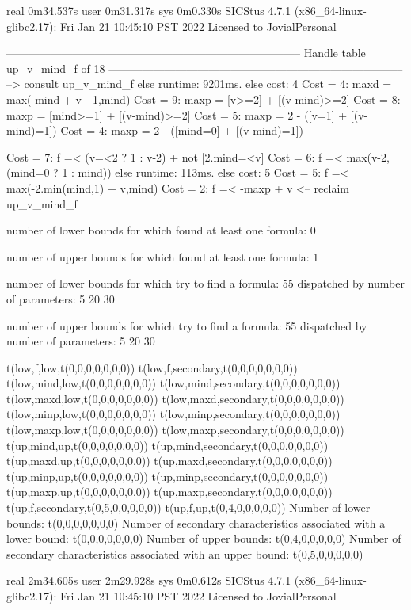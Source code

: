 real	0m34.537s
user	0m31.317s
sys	0m0.330s
SICStus 4.7.1 (x86_64-linux-glibc2.17): Fri Jan 21 10:45:10 PST 2022
Licensed to JovialPersonal


--------------------------------------------------------------------------------
Handle table up_v_mind_f of 18
--------------------------------------------------------------------------------
--> consult up_v_mind_f
else runtime: 9201ms. else cost: 4
Cost =  4:  maxd = max(-mind + v - 1,mind) %
Cost =  9:  maxp = [v>=2] + [(v-mind)>=2]
Cost =  8:  maxp = [mind>=1] + [(v-mind)>=2]
Cost =  5:  maxp = 2 - ([v=1] + [(v-mind)=1])
Cost =  4:  maxp = 2 - ([mind=0] + [(v-mind)=1])
----------

Cost =  7:  f =< (v=<2 ? 1 : v-2) + not [2.mind=<v] %
Cost =  6:  f =< max(v-2, (mind=0 ? 1 : mind)) %
else runtime: 113ms. else cost: 5
Cost =  5:  f =< max(-2.min(mind,1) + v,mind)
Cost =  2:  f =< -maxp + v
<-- reclaim up_v_mind_f

number of lower bounds for which found at least one formula: 0

number of upper bounds for which found at least one formula: 1

number of lower bounds for which try to find a formula: 55
dispatched by number of parameters: 5  20  30

number of upper bounds for which try to find a formula: 55
dispatched by number of parameters: 5  20  30

t(low,f,low,t(0,0,0,0,0,0,0))
t(low,f,secondary,t(0,0,0,0,0,0,0))
t(low,mind,low,t(0,0,0,0,0,0,0))
t(low,mind,secondary,t(0,0,0,0,0,0,0))
t(low,maxd,low,t(0,0,0,0,0,0,0))
t(low,maxd,secondary,t(0,0,0,0,0,0,0))
t(low,minp,low,t(0,0,0,0,0,0,0))
t(low,minp,secondary,t(0,0,0,0,0,0,0))
t(low,maxp,low,t(0,0,0,0,0,0,0))
t(low,maxp,secondary,t(0,0,0,0,0,0,0))
t(up,mind,up,t(0,0,0,0,0,0,0))
t(up,mind,secondary,t(0,0,0,0,0,0,0))
t(up,maxd,up,t(0,0,0,0,0,0,0))
t(up,maxd,secondary,t(0,0,0,0,0,0,0))
t(up,minp,up,t(0,0,0,0,0,0,0))
t(up,minp,secondary,t(0,0,0,0,0,0,0))
t(up,maxp,up,t(0,0,0,0,0,0,0))
t(up,maxp,secondary,t(0,0,0,0,0,0,0))
t(up,f,secondary,t(0,5,0,0,0,0,0))
t(up,f,up,t(0,4,0,0,0,0,0))
Number of lower bounds:                                             t(0,0,0,0,0,0,0)
Number of secondary characteristics associated with a lower bound:  t(0,0,0,0,0,0,0)
Number of upper bounds:                                             t(0,4,0,0,0,0,0)
Number of secondary characteristics associated with an upper bound: t(0,5,0,0,0,0,0)

real	2m34.605s
user	2m29.928s
sys	0m0.612s
SICStus 4.7.1 (x86_64-linux-glibc2.17): Fri Jan 21 10:45:10 PST 2022
Licensed to JovialPersonal


